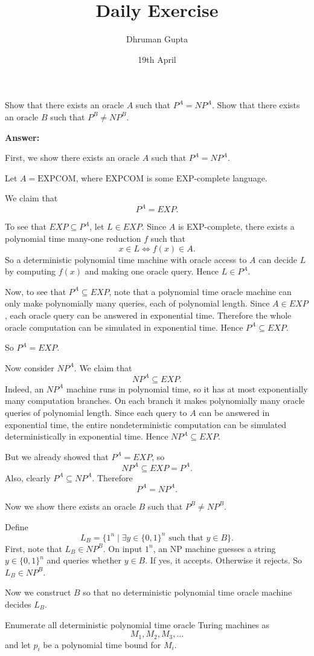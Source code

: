 \documentclass[11pt]{article}
\title{Daily Exercise}
\author{Dhruman Gupta}
\date{19th April}
\begin{document}

Show that there exists an oracle $A$ such that $P^A = NP^A$. Show that there exists an oracle $B$ such that $P^B \neq NP^B$.

\textbf{Answer:}

First, we show there exists an oracle $A$ such that $P^A = NP^A$.

Let $A = \text{EXPCOM}$, where $\text{EXPCOM}$ is some EXP-complete language.

We claim that
\[
P^A = EXP.
\]

To see that $EXP \subseteq P^A$, let $L \in EXP$. Since $A$ is EXP-complete, there exists a polynomial time many-one reduction $f$ such that
\[
x \in L \iff f(x) \in A.
\]
So a deterministic polynomial time machine with oracle access to $A$ can decide $L$ by computing $f(x)$ and making one oracle query. Hence $L \in P^A$.

Now, to see that $P^A \subseteq EXP$, note that a polynomial time oracle machine can only make polynomially many queries, each of polynomial length. Since $A \in EXP$, each oracle query can be answered in exponential time. Therefore the whole oracle computation can be simulated in exponential time. Hence $P^A \subseteq EXP$.

So $P^A = EXP$.

Now consider $NP^A$. We claim that
\[
NP^A \subseteq EXP.
\]
Indeed, an $NP^A$ machine runs in polynomial time, so it has at most exponentially many computation branches. On each branch it makes polynomially many oracle queries of polynomial length. Since each query to $A$ can be answered in exponential time, the entire nondeterministic computation can be simulated deterministically in exponential time. Hence $NP^A \subseteq EXP$.

But we already showed that $P^A = EXP$, so
\[
NP^A \subseteq EXP = P^A.
\]
Also, clearly $P^A \subseteq NP^A$. Therefore
\[
P^A = NP^A.
\]

Now we show there exists an oracle $B$ such that $P^B \neq NP^B$.

Define
\[
L_B = \{1^n \mid \exists y \in \{0,1\}^n \text{ such that } y \in B\}.
\]
First, note that $L_B \in NP^B$. On input $1^n$, an NP machine guesses a string $y \in \{0,1\}^n$ and queries whether $y \in B$. If yes, it accepts. Otherwise it rejects. So $L_B \in NP^B$.

Now we construct $B$ so that no deterministic polynomial time oracle machine decides $L_B$.

Enumerate all deterministic polynomial time oracle Turing machines as
\[
M_1, M_2, M_3, \dots
\]
and let $p_i$ be a polynomial time bound for $M_i$.
\end{document}
